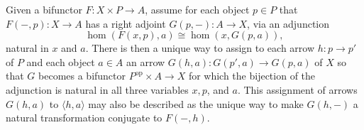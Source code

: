 Given a bifunctor $F : X \times P \to A$, assume for each object $p \in P$ that $F(-, p) : X \to A$ has a right adjoint $G(p, -) : A \to X$, via an adjunction
$$\hom(F(x, p), a) \cong \hom(x, G(p, a)),$$
natural in $x$ and $a$. There is then a unique way to assign to each arrow $h : p \to p'$ of $P$ and each object $a \in A$ an arrow $G(h, a) : G(p', a) \to G(p, a)$ of $X$ so that $G$ becomes a bifunctor $P^{\mathrm{op}} \times A \to X$ for which the bijection of the adjunction is natural in all three variables $x, p$, and $a$. This assignment of arrows $G(h, a)$ to $\langle h, a \rangle$ may also be described as the unique way to make $G(h, -)$ a natural transformation conjugate to $F(-, h)$.
